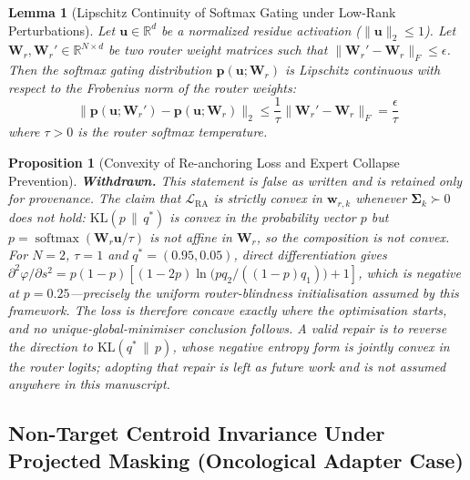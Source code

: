 \documentclass{article}
\newtheorem{lemma}[theorem]{Lemma}
\newtheorem{proposition}[theorem]{Proposition}
\theoremstyle{definition}
\begin{document}
\begin{lemma}[Lipschitz Continuity of Softmax Gating under Low-Rank Perturbations]
\label{lem:lipschitz}
Let $\mathbf{u} \in \mathbb{R}^d$ be a normalized residue activation ($\|\mathbf{u}\|_2 \le 1$). Let $\mathbf{W}_r, \mathbf{W}_r' \in \mathbb{R}^{N \times d}$ be two router weight matrices such that $\|\mathbf{W}_r' - \mathbf{W}_r\|_F \le \epsilon$. Then the softmax gating distribution $\mathbf{p}(\mathbf{u}; \mathbf{W}_r)$ is Lipschitz continuous with respect to the Frobenius norm of the router weights:
\begin{equation}
\|\mathbf{p}(\mathbf{u}; \mathbf{W}_r') - \mathbf{p}(\mathbf{u}; \mathbf{W}_r)\|_2 \le \frac{1}{\tau} \|\mathbf{W}_r' - \mathbf{W}_r\|_F = \frac{\epsilon}{\tau}
\end{equation}
where $\tau > 0$ is the router softmax temperature.
\end{lemma}

\begin{proposition}[Convexity of Re-anchoring Loss and Expert Collapse Prevention]
\label{prop:convexity}
\textbf{Withdrawn.} This statement is false as written and is retained only for provenance. The claim that $\mathcal{L}_{\text{RA}}$ is strictly convex in $\mathbf{w}_{r,k}$ whenever $\mathbf{\Sigma}_k \succ 0$ does not hold: $\mathrm{KL}(p \,\|\, q^{*})$ is convex in the \emph{probability vector} $p$ but $p = \operatorname{softmax}(\mathbf{W}_r\mathbf{u}/\tau)$ is not affine in $\mathbf{W}_r$, so the composition is not convex. For $N=2$, $\tau=1$ and $q^{*}=(0.95, 0.05)$, direct differentiation gives $\partial^{2}\varphi/\partial s^{2} = p(1-p)\left[(1-2p)\ln\!\big(pq_2/((1-p)q_1)\big) + 1\right]$, which is negative at $p = 0.25$---precisely the uniform router-blindness initialisation assumed by this framework. The loss is therefore concave exactly where the optimisation starts, and no unique-global-minimiser conclusion follows. A valid repair is to reverse the direction to $\mathrm{KL}(q^{*}\,\|\,p)$, whose negative entropy form \emph{is} jointly convex in the router logits; adopting that repair is left as future work and is not assumed anywhere in this manuscript.
\end{proposition}

\subsection{Non-Target Centroid Invariance Under Projected Masking (Oncological Adapter Case)}
\label{subsec:oncology_invariance_proof}
\end{document}
